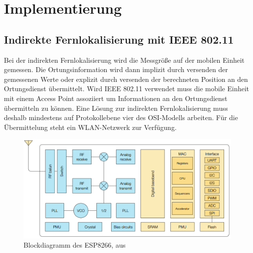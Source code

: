 \chapter{Implementierung}

\section{Indirekte Fernlokalisierung mit IEEE 802.11}
\label{ch:phase1}
Bei der indirekten Fernlokalisierung wird die Messgröße auf der mobilen Einheit gemessen.
Die Ortungsinformation wird dann implizit durch versenden der gemessenen Werte oder explizit durch versenden der berechneten Position an den Ortungsdienst übermittelt.
Wird IEEE 802.11 verwendet muss die mobile Einheit mit einem Access Point assoziiert um Informationen an den Ortungsdienst übermitteln zu können.
Eine Lösung zur indirekten Fernlokalisierung muss deshalb mindestens auf Protokollebene vier des OSI-Modells arbeiten.
Für die Übermittelung steht ein WLAN-Netzwerk zur Verfügung.

\begin{figure}[h]
  \centering
	\includegraphics[width=\textwidth]{images/espblock.png}
  \caption{Blockdiagramm des ESP8266, aus \cite{espressif2017esp8266}}
  \label{fig:espblock}
\end{figure}

